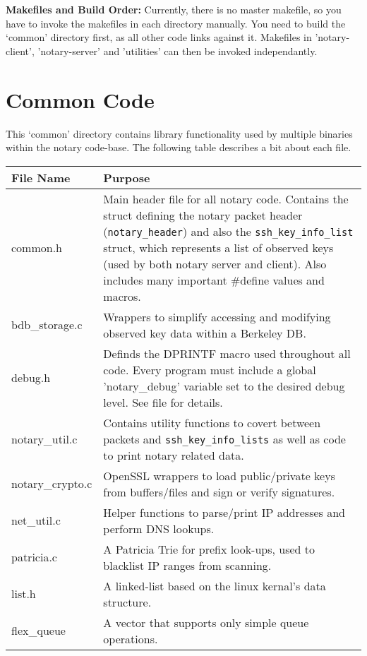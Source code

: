 \documentclass[pdftex,singlecolumn,11pt,letterpaper]{article}
\begin{document}
\noindent\textbf{Makefiles and Build Order:}  Currently, there is no master
makefile, so you have to invoke the makefiles in each directory manually. 
You need to build the `common' directory first, as all other code
links against it.  Makefiles in 'notary-client', 'notary-server' and 'utilities'
can then be invoked independantly.  

\section {Common Code}

This `common' directory contains library functionality used by multiple 
binaries within the notary code-base.  The following table describes 
a bit about each file.  \\ 

\begin{tabular*}{1.1\textwidth}{ @{\extracolsep{\fill}} | p{3cm} | p{10cm} | }
\hline 
\textbf{File Name}  & \textbf{Purpose} \\
\hline 
common.h & Main header file for all notary code.  Contains the struct 
defining the notary packet header (\texttt{notary\_header}) and also the 
\texttt{ssh\_key\_info\_list} struct, which represents a list of observed
keys (used by both notary server and client).  Also includes many 
important \#define values and macros. \\

bdb\_storage.c & Wrappers to simplify accessing and modifying observed key
data within a Berkeley DB. \\  

debug.h & Definds the DPRINTF macro used throughout all code.  Every program
must include a global 'notary\_debug' variable set to the desired debug level.
See file for details.  \\

notary\_util.c & Contains utility functions to covert between packets and 
\texttt{ssh\_key\_info\_lists} as well as code to print notary related data. \\

notary\_crypto.c & OpenSSL wrappers to load public/private
keys from buffers/files and sign or verify signatures.  \\

net\_util.c & Helper functions to parse/print IP addresses and perform DNS 
lookups.  \\

patricia.c & A Patricia Trie for prefix look-ups, used to blacklist IP ranges
from scanning.  \\

list.h & A linked-list based on the linux kernal's data structure.  \\

flex\_queue & A vector that supports only simple queue operations. \\ 
\hline
\end{tabular*}\\
\end{document}
